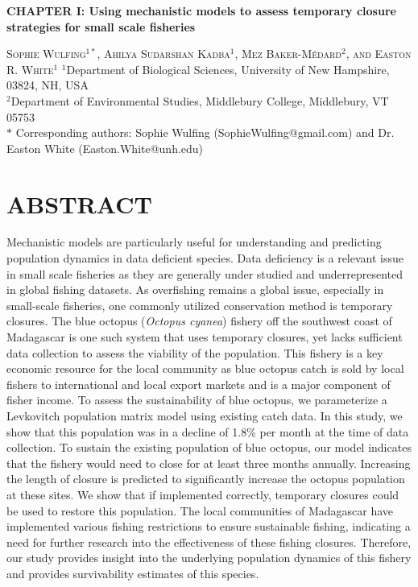 \documentclass[
]{article}
\author{}
\date{\vspace{-2.5em}}
\begin{document}
\setcounter{page}{7}

\begin{center}
    
\textbf{\Large CHAPTER I: Using mechanistic models to assess temporary closure strategies for small scale fisheries}
    
\textsc{Sophie Wulfing$^{1*}$, Ahilya Sudarshan Kadba$^{1}$, Mez Baker-Médard$^{2}$, and Easton R. White$^{1}$}
\vspace{3 mm}
\normalsize{\indent $^1$Department of Biological Sciences, University of New Hampshire, 03824, NH, USA \\ $^2$Department of Environmental Studies, Middlebury College, Middlebury, VT 05753\\}
$\text{*}$ Corresponding authors: Sophie Wulfing (SophieWulfing@gmail.com) and Dr. Easton White (Easton.White@unh.edu)
\end{center}

\newpage

\linenumbers

\hypertarget{abstract}{%
\section{ABSTRACT}\label{abstract}}

Mechanistic models are particularly useful for understanding and predicting population dynamics in data deficient species. Data deficiency is a relevant issue in small scale fisheries as they are generally under studied and underrepresented in global fishing datasets. As overfishing remains a global issue, especially in small-scale fisheries, one commonly utilized conservation method is temporary closures. The blue octopus (\emph{Octopus cyanea}) fishery off the southwest coast of Madagascar is one such system that uses temporary closures, yet lacks sufficient data collection to assess the viability of the population. This fishery is a key economic resource for the local community as blue octopus catch is sold by local fishers to international and local export markets and is a major component of fisher income. To assess the sustainability of blue octopus, we parameterize a Levkovitch population matrix model using existing catch data. In this study, we show that this population was in a decline of 1.8\% per month at the time of data collection. To sustain the existing population of blue octopus, our model indicates that the fishery would need to close for at least three months annually. Increasing the length of closure is predicted to significantly increase the octopus population at these sites. We show that if implemented correctly, temporary closures could be used to restore this population. The local communities of Madagascar have implemented various fishing restrictions to ensure sustainable fishing, indicating a need for further research into the effectiveness of these fishing closures. Therefore, our study provides insight into the underlying population dynamics of this fishery and provides survivability estimates of this species.
\end{document}

